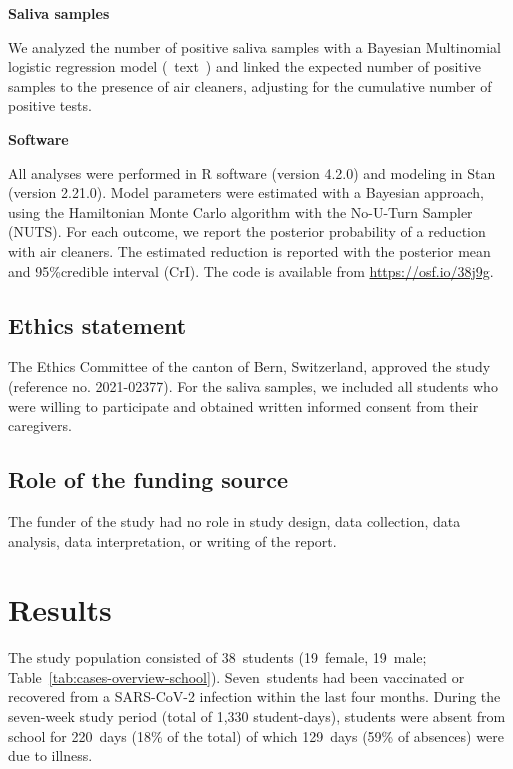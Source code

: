 \documentclass[fleqn,11pt]{wlscirep}
\begin{document}
\noindent\textbf{Saliva samples} \smallskip

\noindent We analyzed the number of positive saliva samples with a Bayesian Multinomial logistic regression model (\supp~text~) and linked the expected number of positive samples to the presence of air cleaners, adjusting for the cumulative number of positive tests. \medskip

\noindent\textbf{Software}\smallskip

\noindent All analyses were performed in R software (version 4.2.0)\cite{RCoreTeam2022} and modeling in Stan (version 2.21.0)\cite{Carpenter2017}. Model parameters were estimated with a Bayesian approach, using the Hamiltonian Monte Carlo algorithm with the No-U-Turn Sampler (NUTS)\cite{Hoffman2014}. For each outcome, we report the posterior probability of a reduction with air cleaners. The estimated reduction is reported with the posterior mean and 95\%credible interval (CrI). The code is available from \url{https://osf.io/38j9g}.


\subsection*{Ethics statement}

\noindent The Ethics Committee of the canton of Bern, Switzerland, approved the study (reference no. 2021-02377). For the saliva samples, we included all students who were willing to participate and obtained written informed consent from their caregivers.

\subsection*{Role of the funding source}

The funder of the study had no role in study design, data collection, data analysis, data interpretation, or writing of the report.


\newpage

\section*{Results}

The study population consisted of 38~students (19~female, 19~male; Table~\ref{tab:cases-overview-school}). Seven~students had been vaccinated or recovered from a SARS-CoV-2 infection within the last four months. During the seven-week study period (total of 1,330 student-days), students were absent from school for 220~days (18\% of the total) of which 129~days (59\% of absences) were due to illness.  
\end{document}
